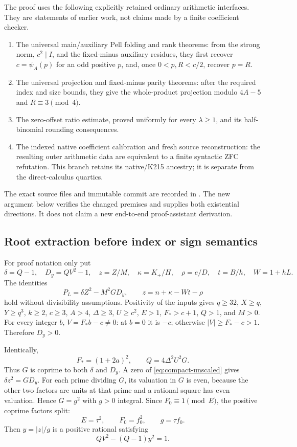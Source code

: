 The proof uses the following explicitly retained ordinary arithmetic
interfaces. They are statements of earlier work, not claims made by a
finite coefficient checker.
\begin{enumerate}
\item The universal main/auxiliary Pell folding and rank theorems:
from the strong norm, $c^2\mid I$, and the fixed-minus auxiliary
residues, they first recover $c=\psi_A(p)$ for an odd positive $p$,
and, once $0<p,R<c/2$, recover $p=R$.
\item The universal projection and fixed-minus parity theorems:
after the required index and size bounds, they give the whole-product
projection modulo $4A-5$ and $R\equiv3\pmod4$.
\item The zero-offset ratio estimate, proved uniformly for every
$\lambda\ge1$, and its half-binomial rounding consequences.
\item The indexed native coefficient calibration and fresh source
reconstruction: the resulting outer arithmetic data are equivalent to
a finite syntactic ZFC refutation. This branch retains its native/K215
ancestry; it is separate from the direct-calculus quartics.
\end{enumerate}
The exact source files and immutable commit are recorded in
. The new argument below verifies the
changed premises and supplies both existential directions. It does not
claim a new end-to-end proof-assistant derivation.

\subsection{Root extraction before index or sign semantics}

For proof notation only put
\[
 \delta=Q-1,\quad D_y=QV^2-1,\quad z=Z/M,\quad
 \kappa=K_+/H,\quad \rho=e/D,\quad t=B/h,\quad W=1+hL.
\]
The identities
\begin{equation}
 P_L=\delta Z^2-M^2GD_y,\qquad
 z=n+\kappa-Wt-\rho
 \label{eq:compact-carrier}
\end{equation}
hold without divisibility assumptions. Positivity of the inputs gives
$q\ge32$, $X\ge q$, $Y\ge q^3$, $k\ge2$, $c\ge3$, $A>4$,
$\Delta\ge3$, $U\ge c^2$, $E>1$, $F_*>c+1$, $Q>1$, and $M>0$.
For every integer $b$, $V=F_*b-c\ne0$: at $b=0$ it is $-c$;
otherwise $|V|\ge F_*-c>1$. Therefore $D_y>0$.

Identically,
\[
 F_*=(1+2a)^2,\qquad Q=4\Delta^2U^2G.
\]
Thus $G$ is coprime to both $\delta$ and $D_y$. A zero of
\eqref{eq:compact-unscaled} gives $\delta z^2=GD_y$.
For each prime dividing $G$, its valuation in $G$ is even, because
the other two factors are units at that prime and a rational square
has even valuation. Hence $G=g^2$ with $g>0$ integral. Since
$F_0\equiv1\pmod E$, the positive coprime factors split:
\[
 E=\tau^2,\qquad F_0=f_0^2,\qquad g=\tau f_0.
\]
Then $y=|z|/g$ is a positive rational satisfying
\begin{equation}
 QV^2-(Q-1)y^2=1.
 \label{eq:compact-adjacent}
\end{equation}

